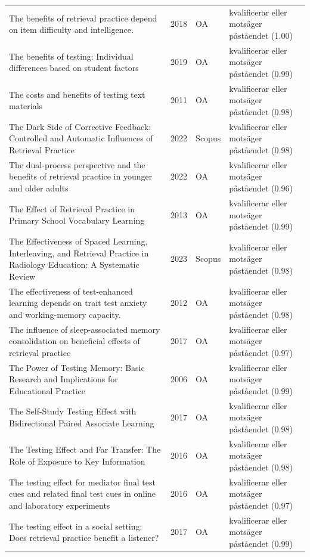 \begin{longtable}{@{}%
  >{\raggedright\arraybackslash}p{}c%
  >{\raggedright\arraybackslash}p{}%
  >{\raggedright\arraybackslash}p{}@{}}
The benefits of retrieval practice depend on item difficulty and intelligence. & 2018 & OA & kvalificerar eller motsäger påståendet (1.00) \\
The benefits of testing: Individual differences based on student factors & 2019 & OA & kvalificerar eller motsäger påståendet (0.99) \\
The costs and benefits of testing text materials & 2011 & OA & kvalificerar eller motsäger påståendet (0.98) \\
The Dark Side of Corrective Feedback: Controlled and Automatic Influences of Retrieval Practice & 2022 & Scopus & kvalificerar eller motsäger påståendet (0.98) \\
The dual-process perspective and the benefits of retrieval practice in younger and older adults & 2022 & OA & kvalificerar eller motsäger påståendet (0.96) \\
The Effect of Retrieval Practice in Primary School Vocabulary Learning & 2013 & OA & kvalificerar eller motsäger påståendet (0.99) \\
The Effectiveness of Spaced Learning, Interleaving, and Retrieval Practice in Radiology Education: A Systematic Review & 2023 & Scopus & kvalificerar eller motsäger påståendet (0.98) \\
The effectiveness of test-enhanced learning depends on trait test anxiety and working-memory capacity. & 2012 & OA & kvalificerar eller motsäger påståendet (0.98) \\
The influence of sleep-associated memory consolidation on beneficial effects of retrieval practice & 2017 & OA & kvalificerar eller motsäger påståendet (0.97) \\
The Power of Testing Memory: Basic Research and Implications for Educational Practice & 2006 & OA & kvalificerar eller motsäger påståendet (0.99) \\
The Self-Study Testing Effect with Bidirectional Paired Associate Learning & 2017 & OA & kvalificerar eller motsäger påståendet (0.98) \\
The Testing Effect and Far Transfer: The Role of Exposure to Key Information & 2016 & OA & kvalificerar eller motsäger påståendet (0.98) \\
The testing effect for mediator final test cues and related final test cues in online and laboratory experiments & 2016 & OA & kvalificerar eller motsäger påståendet (0.97) \\
The testing effect in a social setting: Does retrieval practice benefit a listener? & 2017 & OA & kvalificerar eller motsäger påståendet (0.99) \\

\end{longtable}
